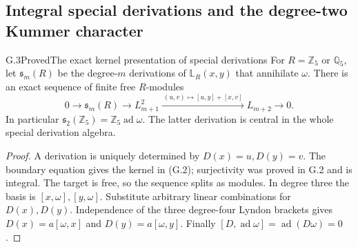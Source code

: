 \subsection{Integral special derivations and the degree-two Kummer character}

\begin{statement}{G.3}{Proved}{The exact kernel presentation of special derivations}
For $R=\mathbb Z_5$ or $\mathbb Q_5$, let $\mathfrak s_m(R)$ be the
degree-$m$ derivations of $\mathbb L_R(x,y)$ that annihilate $\omega$.
There is an exact sequence of finite free $R$-modules
\[
 0\longrightarrow\mathfrak s_m(R)\longrightarrow L_{m+1}^2
 \xrightarrow{\ (u,v)\mapsto[u,y]+[x,v]\ }L_{m+2}
 \longrightarrow0.                                      \tag{G.2}
\]
In particular $\mathfrak s_2(\mathbb Z_5)=\mathbb Z_5\operatorname{ad}\omega$.
The latter derivation is central in the whole special derivation algebra.
\end{statement}
\begin{proof}
A derivation is uniquely determined by $D(x)=u,D(y)=v$. The boundary
equation gives the kernel in (G.2); surjectivity was proved in G.2 and is
integral. The target is free, so the sequence splits as modules.
In degree three the basis is $[x,\omega],[y,\omega]$. Substitute arbitrary
linear combinations for $D(x),D(y)$. Independence of the three degree-four
Lyndon brackets gives
$D(x)=a[\omega,x]$ and $D(y)=a[\omega,y]$.
Finally $[D,\operatorname{ad}\omega]=\operatorname{ad}(D\omega)=0$.
\end{proof}

